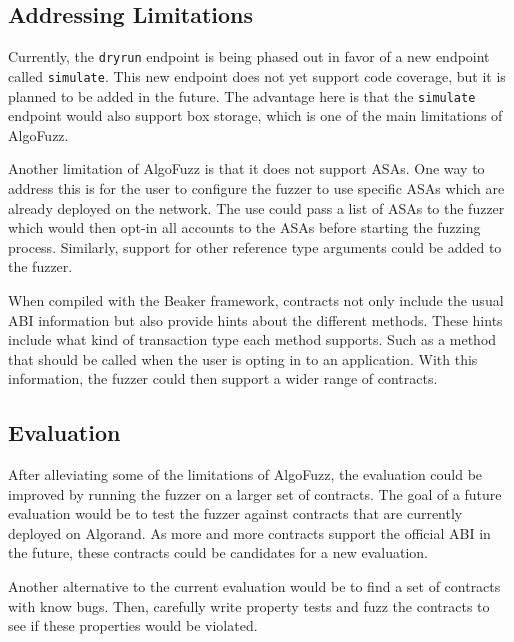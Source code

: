 \subsection*{Addressing Limitations}
Currently, the \texttt{dryrun} endpoint is being phased out in favor of a new endpoint called \texttt{simulate}.
This new endpoint does not yet support code coverage, but it is planned to be added in the future.
The advantage here is that the \texttt{simulate} endpoint would also support box storage, which is one of the main limitations of AlgoFuzz.

Another limitation of AlgoFuzz is that it does not support \acp{ASA}.
One way to address this is for the user to configure the fuzzer to use specific \acp{ASA} which are already deployed on the network.
The use could pass a list of \acp{ASA} to the fuzzer which would then opt-in all accounts to the \acp{ASA} before starting the fuzzing process.
Similarly, support for other reference type arguments could be added to the fuzzer.


When compiled with the Beaker framework, contracts not only include the usual \ac{ABI} information but also provide hints about the different methods.
These hints include what kind of transaction type each method supports.
Such as a method that should be called when the user is opting in to an application.
With this information, the fuzzer could then support a wider range of contracts.

\subsection*{Evaluation}
After alleviating some of the limitations of AlgoFuzz, the evaluation could be improved by running the fuzzer on a larger set of contracts.
The goal of a future evaluation would be to test the fuzzer against contracts that are currently deployed on Algorand.
As more and more contracts support the official \ac{ABI} in the future, these contracts could be candidates for a new evaluation.

Another alternative to the current evaluation would be to find a set of contracts with know bugs.
Then, carefully write property tests and fuzz the contracts to see if these properties would be violated.